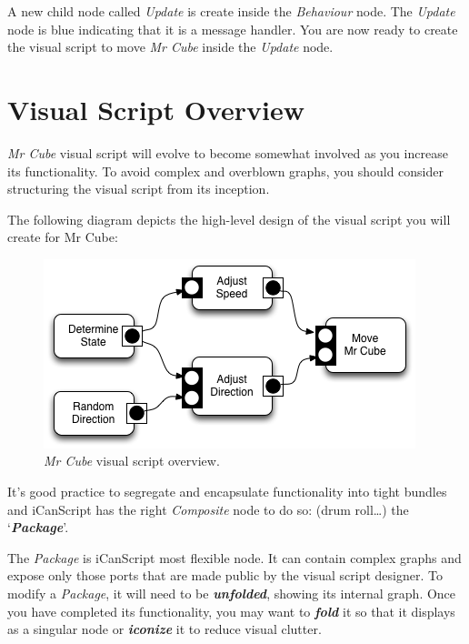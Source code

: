 A new child node called \emph{Update} is create inside the \emph{Behaviour} node. The \emph{Update} node is blue indicating that it is a message handler. You are now ready to create the visual script to move \emph{Mr Cube} inside the \emph{Update} node.

\section{Visual Script Overview}
\label{visualscriptoverview}

\emph{Mr Cube} visual script will evolve to become somewhat involved as you increase its functionality. To avoid complex and overblown graphs, you should consider structuring the visual script from its inception.

The following diagram depicts the high-level design of the visual script you will create for Mr Cube:

\begin{figure}[htbp]
\centering
\includegraphics[keepaspectratio,width=\textwidth,height=0.75\textheight]{mr-cube-script-overview.png}
\caption{\emph{Mr Cube} visual script overview.}
\label{mr-cube-script-overview.png}
\end{figure}

It's good practice to segregate and encapsulate functionality into tight bundles and iCanScript has the right \emph{Composite} node to do so: (drum roll{\ldots}) the `\emph{\textbf{Package}}'.

The \emph{Package} is iCanScript most flexible node. It can contain complex graphs and expose only those ports that are made public by the visual script designer. To modify a \emph{Package}, it will need to be \emph{\textbf{unfolded}}, showing its internal graph. Once you have completed its functionality, you may want to \emph{\textbf{fold}} it so that it displays as a singular node or \emph{\textbf{iconize}} it to reduce visual clutter.


